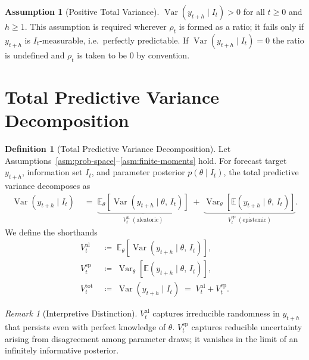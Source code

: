 \documentclass[12pt,openany]{book}
\newcommand{\calI}{\mathcal{I}}
\newcommand{\E}{\mathbb{E}}
\numberwithin{equation}{chapter}
\theoremstyle{plain}
\theoremstyle{definition}
\newtheorem{definition}[theorem]{Definition}
\newtheorem{assumption}[theorem]{Assumption}
\theoremstyle{remark}
\newtheorem{remark}[theorem]{Remark}
\numberwithin{equation}{chapter}
\theoremstyle{plain}
\DeclareMathOperator{\Var}{Var}
\def\calI{I}%
\begin{document}
\begin{assumption}[Positive Total Variance]
\label{asm:pos-var}
$\Var(y_{t+h} \mid \calI_t) > 0$ for all $t \geq 0$ and $h \geq 1$.
This assumption is required wherever $\rho_t$ is formed as a ratio;
it fails only if $y_{t+h}$ is $\calI_t$-measurable, i.e.\ perfectly
predictable.  If $\Var(y_{t+h} \mid \calI_t) = 0$ the ratio is undefined
and $\rho_t$ is taken to be $0$ by convention.
\end{assumption}

\section{Total Predictive Variance Decomposition}

\begin{definition}[Total Predictive Variance Decomposition]
\label{def:var-decomp}
Let Assumptions~\ref{asm:prob-space}--\ref{asm:finite-moments} hold.
For forecast target $y_{t+h}$, information set $\calI_t$, and
parameter posterior $p(\theta \mid \calI_t)$, the total predictive
variance decomposes as
\begin{align}
  \Var(y_{t+h} \mid \calI_t)
  &\;=\;
  \underbrace{
    \E_\theta\!\left[\Var(y_{t+h} \mid \theta,\, \calI_t)\right]
  }_{\displaystyle V^{\mathrm{al}}_t \;(\text{aleatoric})}
  \;+\;
  \underbrace{
    \Var_\theta\!\left[\E(y_{t+h} \mid \theta,\, \calI_t)\right]
  }_{\displaystyle V^{\mathrm{ep}}_t \;(\text{epistemic})}.
  \label{eq:var-decomp}
\end{align}
We define the shorthands
\begin{align}
  V^{\mathrm{al}}_t
  &\;\coloneqq\;
  \E_\theta\!\left[\Var(y_{t+h} \mid \theta,\, \calI_t)\right],
  \label{eq:Val-def}\\
  V^{\mathrm{ep}}_t
  &\;\coloneqq\;
  \Var_\theta\!\left[\E(y_{t+h} \mid \theta,\, \calI_t)\right],
  \label{eq:Vep-def}\\
  V^{\mathrm{tot}}_t
  &\;\coloneqq\;
  \Var(y_{t+h} \mid \calI_t)
  \;=\; V^{\mathrm{al}}_t + V^{\mathrm{ep}}_t.
  \label{eq:Vtot-def}
\end{align}
\end{definition}

\begin{remark}[Interpretive Distinction]
\label{rem:interp}
$V^{\mathrm{al}}_t$ captures irreducible randomness in $y_{t+h}$ that
persists even with perfect knowledge of $\theta$.  $V^{\mathrm{ep}}_t$
captures reducible uncertainty arising from disagreement among
parameter draws; it vanishes in the limit of an infinitely informative
posterior.
\end{remark}
\end{document}
